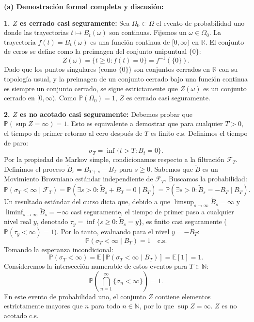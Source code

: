 \documentclass[11pt, letterpaper]{article}
\begin{document}
\begin{solucion}
    \vspace{3mm}
    \textbf{(a) Demostración formal completa y discusión:}

    \textbf{1. $Z$ es cerrado casi seguramente:}
    Sea $\Omega_0 \subset \Omega$ el evento de probabilidad uno donde las trayectorias $t \mapsto B_t(\omega)$ son continuas. Fijemos un $\omega \in \Omega_0$.
    La trayectoria $f(t) = B_t(\omega)$ es una función continua de $[0, \infty)$ en $\mathbb{R}$.
    El conjunto de ceros se define como la preimagen del conjunto unipuntual $\{0\}$:
    \[ Z(\omega) = \{ t \ge 0 : f(t) = 0 \} = f^{-1}(\{0\}). \]
    Dado que los puntos singulares (como $\{0\}$) son conjuntos cerrados en $\mathbb{R}$ con su topología usual, y la preimagen de un conjunto cerrado bajo una función continua es siempre un conjunto cerrado, se sigue estrictamente que $Z(\omega)$ es un conjunto cerrado en $[0, \infty)$. Como $\mathbb{P}(\Omega_0) = 1$, $Z$ es cerrado casi seguramente.

    \textbf{2. $Z$ es no acotado casi seguramente:}
    Debemos probar que $\mathbb{P}(\sup Z = \infty) = 1$. Esto es equivalente a demostrar que para cualquier $T > 0$, el tiempo de primer retorno al cero después de $T$ es finito c.s. 
    Definimos el tiempo de paro:
    \[ \sigma_T = \inf\{ t > T : B_t = 0 \}. \]
    Por la propiedad de Markov simple, condicionamos respecto a la filtración $\mathcal{F}_T$. Definimos el proceso $\tilde{B}_s = B_{T+s} - B_T$ para $s \ge 0$. Sabemos que $\tilde{B}$ es un Movimiento Browniano estándar independiente de $\mathcal{F}_T$.
    Buscamos la probabilidad:
    \[ \mathbb{P}(\sigma_T < \infty \mid \mathcal{F}_T) = \mathbb{P}(\exists s > 0 : \tilde{B}_s + B_T = 0 \mid B_T) = \mathbb{P}(\exists s > 0 : \tilde{B}_s = -B_T \mid B_T). \]
    Un resultado estándar del curso dicta que, debido a que $\limsup_{s \to \infty} \tilde{B}_s = \infty$ y $\liminf_{s \to \infty} \tilde{B}_s = -\infty$ casi seguramente, el tiempo de primer paso a cualquier nivel real $y$, denotado $\tau_y = \inf\{s \ge 0 : \tilde{B}_s = y\}$, es finito casi seguramente ($\mathbb{P}(\tau_y < \infty) = 1$).
    Por lo tanto, evaluando para el nivel $y = -B_T$:
    \[ \mathbb{P}(\sigma_T < \infty \mid B_T) = 1 \quad \text{c.s.} \]
    Tomando la esperanza incondicional:
    \[ \mathbb{P}(\sigma_T < \infty) = \mathbb{E}[\mathbb{P}(\sigma_T < \infty \mid B_T)] = \mathbb{E}[1] = 1. \]
    Consideremos la intersección numerable de estos eventos para $T \in \mathbb{N}$:
    \[ \mathbb{P}\left( \bigcap_{n=1}^\infty \{ \sigma_n < \infty \} \right) = 1. \]
    En este evento de probabilidad uno, el conjunto $Z$ contiene elementos estrictamente mayores que $n$ para todo $n \in \mathbb{N}$, por lo que $\sup Z = \infty$. $Z$ es no acotado c.s.


\end{solucion}
\end{document}

